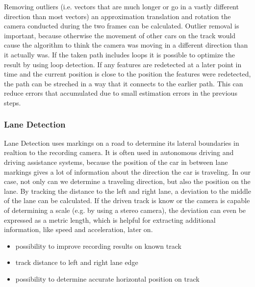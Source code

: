 Removing outliers (i.e. vectors that are much longer or go in a vastly different direction than most vectors) an approximation translation and rotation the camera conducted during the two frames can be calculated.
Outlier removal is important, because otherwise the movement of other cars on the track would cause the algorithm to think the camera was moving in a different direction than it actually was.
If the taken path includes loops it is possible to optimize the result by using loop detection. If any features are redetected at a later point in time and the current position is close to the position the features were redetected, the path can be streched in a way that it connects to the earlier path.
This can reduce errors that accumulated due to small estimation errors in the previous steps.


\subsubsection{Lane Detection}
Lane Detection uses markings on a road to determine its lateral boundaries in realtion to the recording camera. It is often used in autonomous driving and driving assistance systems, because the position of the car in between lane markings gives a lot of information about the direction the car is traveling. 
In our case, not only can we determine a traveling direction, but also the position on the lane.
By tracking the distance to the left and right lane, a deviation to the middle of the lane can be calculated. 
If the driven track is know or the camera is capable of determining a scale (e.g. by using a stereo camera), the deviation can even be expressed as a metric length, which is helpful for extracting additional information, like speed and acceleration, later on.

\begin{itemize}
  \item possibility to improve recording results on known track
  \item track distance to left and right lane edge
  \item possibility to determine accurate horizontal position on track
\end{itemize}

